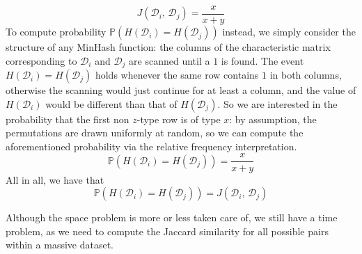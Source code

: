 \documentclass{article}
\begin{document}
  \[
    J ( \mathcal D_i, \, \mathcal D_j ) = \frac{ x }{ x + y }
  \]
  To compute probability
  \( \mathbb P ( H ( \mathcal D_i ) = H ( \mathcal D_j ) ) \) instead, we
  simply consider the structure of any MinHash function: the columns of the
  characteristic matrix corresponding to \( \mathcal D_i \) and
  \( \mathcal D_j \) are scanned until a \( 1 \) is found. The event
  \( H ( \mathcal D_i ) = H ( \mathcal D_j ) \) holds whenever the same row
  contains \( 1 \) in both columns, otherwise the scanning would just continue
  for at least a column, and the value of \( H ( \mathcal D_i ) \) would be
  different than that of \( H ( \mathcal D_j ) \). So we are interested in the
  probability that the first non \( z \)-type row is of type \( x \): by
  assumption, the permutations are drawn uniformly at random, so we can compute
  the aforementioned probability via the relative frequency interpretation.
  \[
    \mathbb P ( H ( \mathcal D_i ) = H ( \mathcal D_j ) ) = \frac{ x }{ x + y }
  \]
  All in all, we have that
  \[
    \mathbb P ( H ( \mathcal D_i ) = H ( \mathcal D_j ) ) =
    J ( \mathcal D_i, \, \mathcal D_j )
  \]

  Although the space problem is more or less taken care of, we still have a
  time problem, as we need to compute the Jaccard similarity for all possible
  pairs within a massive dataset. \\
\end{document}
